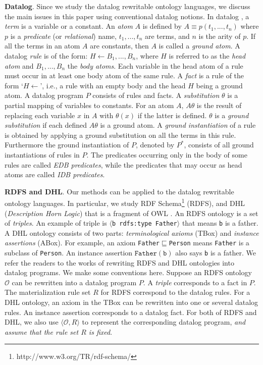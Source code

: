 \documentclass{article}
\begin{document}
\textbf{Datalog}. Since we study the datalog rewritable ontology
languages, we discuss the main issues in this paper using
conventional datalog notions.
In datalog \cite{database}, a \emph{term} is a variable or a constant. An \emph{atom} $A$ is defined by $A\equiv p(t_1,...,t_n)$ where $p$ is a \emph{predicate} (or \emph{relational}) name, $t_1,...,t_n$ are terms, and $n$ is the arity of $p$. If all the terms in an atom $A$ are constants, then $A$ is called a \emph{ground atom}.
A datalog \emph{rule} is of the form: $ H\leftarrow B_1,...,B_n$, where $H$ is referred to as the \emph{head atom} and $B_1,...,B_n$ the \emph{body atoms}. Each variable in the head atom of a rule must occur in at least one body atom of the same rule. A \emph{fact} is a rule of the form `$H\leftarrow$', i.e., a rule with an empty body and the head $H$ being a ground atom. A datalog program $P$ consists of rules and facts.
A \emph{substitution} $\theta$ is a partial mapping of variables to constants. For an atom $A$, $A\theta$ is the result of replacing each variable $x$ in $A$ with $\theta(x)$ if the latter is defined. $\theta$ is a \emph{ground substitution} if each defined $A\theta$ is a ground atom. A \emph{ground instantiation} of a rule is obtained by applying a ground substitution on all the terms in this rule. Furthermore the ground instantiation of $P$, denoted by $P^*$, consists of all ground instantiations of rules in $P$. The predicates occurring only in the body of some rules are called \emph{EDB predicates}, while the predicates that may occur as head atoms are called \emph{IDB predicates}.

\textbf{RDFS and DHL}. Our methods can be applied to the datalog rewritable ontology languages. In particular, we study RDF Schema\footnote{http://www.w3.org/TR/rdf-schema/} (RDFS), and DHL (\emph{Description Horn Logic}) that is a fragment of OWL \cite{DBLP:conf/www/GrosofHVD03}. An RDFS ontology is a set of \emph{triples}. An example of triple is
$\langle$\texttt{b rdfs:type Father}$\rangle$ that means \texttt{b} is a father. A DHL ontology consists of two parts: \emph{terminological axioms} (TBox) and \emph{instance assertions} (ABox). For example, an axiom \texttt{Father$\sqsubseteq$Person} means \texttt{Father} is a subclass of \texttt{Person}. An instance assertion $\texttt{Father}(\texttt{b})$ also says \texttt{b} is a father.
We refer the readers to the works \cite{DBLP:conf/www/GrosofHVD03,DBLP:conf/www/HorrocksP04} of rewriting RDFS and DHL ontologies into datalog programs. We make some conventions here. Suppose an RDFS ontology $\mathcal{O}$
can be rewritten into a datalog program $P$. A \emph{triple} corresponds to a fact in $P$. The materialization rule set $R$ for RDFS correspond to the datalog rules. For a DHL ontology, an axiom in the TBox can be rewritten into one or several datalog rules. An instance assertion corresponds to a datalog fact.
For both of RDFS and DHL, we also use $\langle\mathcal{O}, R\rangle$ to represent the corresponding datalog program, \emph{and assume that the rule set $R$ is fixed}.
\end{document}
